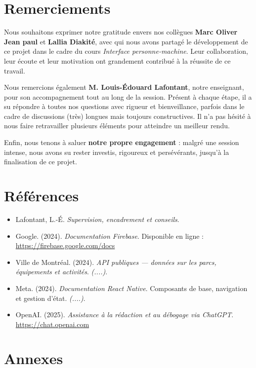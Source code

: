 \documentclass[12pt,a4paper]{article}
\begin{document}
\section*{Remerciements}

Nous souhaitons exprimer notre gratitude envers nos collègues \textbf{Marc Oliver Jean paul} et \textbf{Lallia Diakité}, avec qui nous avons partagé le développement de ce projet dans le cadre du cours \textit{Interface personne-machine}. Leur collaboration, leur écoute et leur motivation ont grandement contribué à la réussite de ce travail.

Nous remercions également \textbf{M. Louis-Édouard Lafontant}, notre enseignant, pour son accompagnement tout au long de la session. Présent à chaque étape, il a su répondre à toutes nos questions avec rigueur et bienveillance, parfois dans le cadre de discussions (très) longues mais toujours constructives. Il n'a pas hésité à nous faire retravailler plusieurs éléments pour atteindre un meilleur rendu.

Enfin, nous tenons à saluer \textbf{notre propre engagement} : malgré une session intense, nous avons su rester investis, rigoureux et persévérants, jusqu'à la finalisation de ce projet.


\section*{Références}

\begin{itemize}
  \item Lafontant, L.-É. \textit{Supervision, encadrement et conseils}. 

  \item Google. (2024). \textit{Documentation Firebase}. Disponible en ligne : \url{https://firebase.google.com/docs}

  \item Ville de Montréal. (2024). \textit{API publiques — données sur les parcs, équipements et activités}. \emph{(....)}.

  \item Meta. (2024). \textit{Documentation React Native}. Composants de base, navigation et gestion d'état. \emph{(....)}.

  \item OpenAI. (2025). \textit{Assistance à la rédaction et au débogage via ChatGPT}. \url{https://chat.openai.com}
\end{itemize}


\appendix
\section{Annexes}
\end{document}
